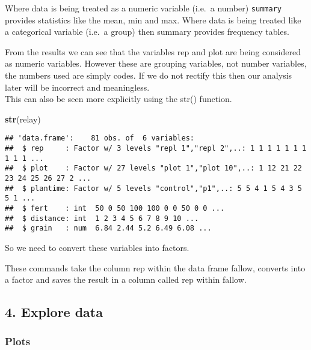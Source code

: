 \documentclass[]{book}
\newenvironment{Shaded}{\begin{snugshade}}{\end{snugshade}}
\newcommand{\KeywordTok}[1]{\textcolor[rgb]{0.13,0.29,0.53}{\textbf{#1}}}
\newcommand{\OperatorTok}[1]{\textcolor[rgb]{0.81,0.36,0.00}{\textbf{#1}}}
\newcommand{\NormalTok}[1]{#1}
\theoremstyle{definition}
\theoremstyle{definition}
\theoremstyle{definition}
\theoremstyle{remark}
\begin{document}
Where data is being treated as a numeric variable (i.e.~a number)
\texttt{summary} provides statistics like the mean, min and max. Where
data is being treated like a categorical variable (i.e.~a group) then
summary provides frequency tables.

From the results we can see that the variables rep and plot are being
considered as numeric variables. However these are grouping variables,
not number variables, the numbers used are simply codes. If we do not
rectify this then our analysis later will be incorrect and
meaningless.\\
This can also be seen more explicitly using the str() function.

\begin{Shaded}
\begin{Highlighting}[]
\KeywordTok{str}\NormalTok{(relay)}
\end{Highlighting}
\end{Shaded}

\begin{verbatim}
## 'data.frame':    81 obs. of  6 variables:
##  $ rep     : Factor w/ 3 levels "repl 1","repl 2",..: 1 1 1 1 1 1 1 1 1 1 ...
##  $ plot    : Factor w/ 27 levels "plot 1","plot 10",..: 1 12 21 22 23 24 25 26 27 2 ...
##  $ plantime: Factor w/ 5 levels "control","p1",..: 5 5 4 1 5 4 3 5 5 1 ...
##  $ fert    : int  50 0 50 100 100 0 0 50 0 0 ...
##  $ distance: int  1 2 3 4 5 6 7 8 9 10 ...
##  $ grain   : num  6.84 2.44 5.2 6.49 6.08 ...
\end{verbatim}

So we need to convert these variables into factors.

\begin{Shaded}
\end{Shaded}

These commands take the column rep within the data frame fallow,
converts into a factor and saves the result in a column called rep
within fallow.

\subsection{4. Explore data}\label{explore-data-3}

\subsubsection{Plots}\label{plots-3}
\end{document}
